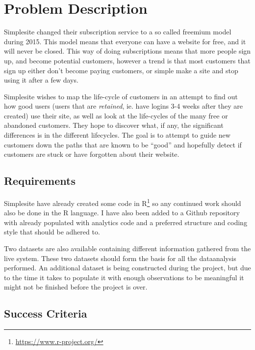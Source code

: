 \section{Problem Description}

Simplesite changed their subscription service to a so called freemium model
during 2015. This model means that everyone can have a website for free, and it
will never be closed. This way of doing subscriptions means that more people
sign up, and become potential customers, however a trend is that most customers
that sign up either don't become paying customers, or simple make a site and
stop using it after a few days.

Simplesite wishes to map the life-cycle of customers in an attempt to find out
how good users (users that are \textit{retained}, ie. have logins 3-4 weeks
after they are created) use their site, as well as look at the life-cycles of
the many free or abandoned customers. They hope to discover what, if any, the
significant differences is in the different lifecycles. The goal is to attempt
to guide new customers down the paths that are known to be ``good'' and
hopefully detect if customers are stuck or have forgotten about their website.


\subsection{Requirements}

Simplesite have already created some code in
R\footnote{\url{https://www.r-project.org/}} so any continued work should also
be done in the R language. I have also been added to a Github repository with
already populated with analytics code and a preferred structure and coding style
that should be adhered to.

Two datasets are also available containing different information gathered from
the live system. These two datasets should form the basis for all the
dataanalysis performed. An additional dataset is being constructed during the
project, but due to the time it takes to populate it with enough observations to
be meaningful it might not be finished before the project is over.


\subsection{Success Criteria}

